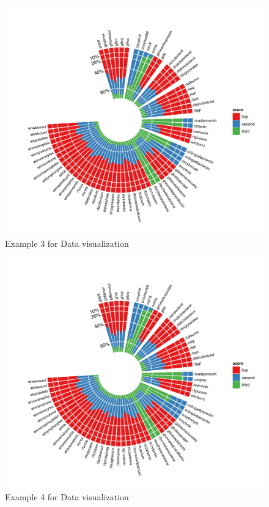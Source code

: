 \documentclass[10pt,journal]{IEEEtran}
\begin{document}
 \begin{figure}
    \centering
    \includegraphics[width=0.9\columnwidth]{Fig/data3.png}
    \caption{Example 3 for Data visualization}
 \end{figure}

 \begin{figure}
    \centering
    \includegraphics[width=0.9\columnwidth]{Fig/data3.png}
    \caption{Example 4 for Data visualization}
 \end{figure}
\end{document}
